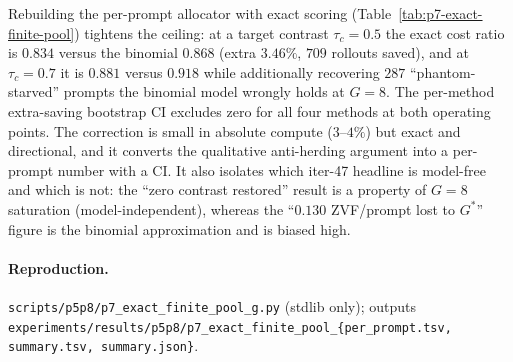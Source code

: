 Rebuilding the per-prompt allocator with exact scoring
(Table~\ref{tab:p7-exact-finite-pool}) tightens the ceiling: at a target
contrast $\tau_c{=}0.5$ the exact cost ratio is $0.834$ versus the
binomial $0.868$ (extra $3.46\%$, $709$ rollouts saved), and at
$\tau_c{=}0.7$ it is $0.881$ versus $0.918$ while additionally recovering
$287$ ``phantom-starved'' prompts the binomial model wrongly holds at
$G{=}8$. The per-method extra-saving bootstrap CI excludes zero for all
four methods at both operating points. The correction is small in
absolute compute ($3$--$4\%$) but exact and directional, and it converts
the qualitative anti-herding argument into a per-prompt number with a CI.
It also isolates which iter-47 headline is model-free and which is not:
the ``zero contrast restored'' result is a property of $G{=}8$ saturation
(model-independent), whereas the ``$0.130$ ZVF/prompt lost to $G^*$''
figure is the binomial approximation and is biased high.

\begin{table}[t]
\centering
\caption{Exact finite-pool (hypergeometric, Eq.~\eqref{eq:cp-exact})
versus i.i.d.\ binomial scoring of the per-prompt Iso-G allocator on the
N2 four-method tensors ($2{,}560$ prompt-steps). Both allocators pick the
smallest $G'\in\{2,\dots,7\}$ with $\mathrm{CP}\ge\tau_c$ else keep
$G{=}8$; preserved contrast is always scored with the model-free
$\mathrm{CP}_\text{exact}$. ``Extra saving'' is binomial minus exact
rollout spend; ``phantom'' is prompts the binomial model wrongly labels
un-economizable that exact accounting recovers.}
\label{tab:p7-exact-finite-pool}
\end{table}

\paragraph{Reproduction.}
\texttt{scripts/p5p8/p7\_exact\_finite\_pool\_g.py} (stdlib only); outputs
\texttt{experiments/results/p5p8/p7\_exact\_finite\_pool\_\{per\_prompt.tsv,
summary.tsv, summary.json\}}.

